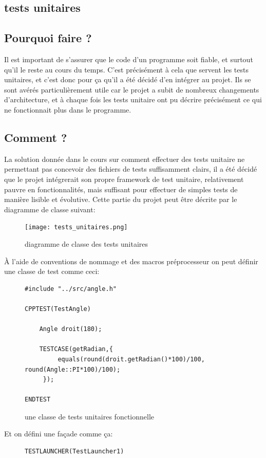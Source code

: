 \documentclass[10pt,a4paper]{report}
\begin{document}
\begin{spacing}{0.8}
\chapter{tests unitaires}\label{tests}
\section{Pourquoi faire ?}
Il est important de s'assurer que le code d'un programme soit fiable, et surtout qu'il le reste au cours du temps. C'est précisément à cela que servent les tests unitaires, et c'est donc pour ça qu'il a été décidé d'en intégrer au projet. Ils se sont avérés particulièrement utile car le projet a subit de nombreux changements d'architecture, et à chaque fois les tests unitaire ont pu décrire précisément ce qui ne fonctionnait plus dans le programme.
\section{Comment ?}
La solution donnée dans le cours sur comment effectuer des tests unitaire ne permettant pas concevoir des fichiers de tests suffisamment clairs, il a été décidé que le projet intégrerait son propre framework de test unitaire, relativement pauvre en fonctionnalités, mais suffisant pour effectuer de simples tests de manière lisible et évolutive.
Cette partie du projet peut être décrite par le diagramme de classe suivant:
\begin{figure}[H]
\texttt{[image: tests\_unitaires.png]}
\caption{diagramme de classe des tests unitaires}
\end{figure}
À l'aide de conventions de nommage et des macros préprocesseur on peut définir une classe de test comme ceci:
\begin{figure}[H]
\begin{verbatim}
#include "../src/angle.h"

CPPTEST(TestAngle)

    Angle droit(180);

    TESTCASE(getRadian,{
         equals(round(droit.getRadian()*100)/100, round(Angle::PI*100)/100);
     });

ENDTEST

\end{verbatim}
\caption{une classe de tests unitaires fonctionnelle}
\end{figure}
Et on défini une façade comme ça:
\begin{figure}[H]
\begin{verbatim}
TESTLAUNCHER(TestLauncher1)


\end{verbatim}
\end{figure}
\end{spacing}
\end{document}
